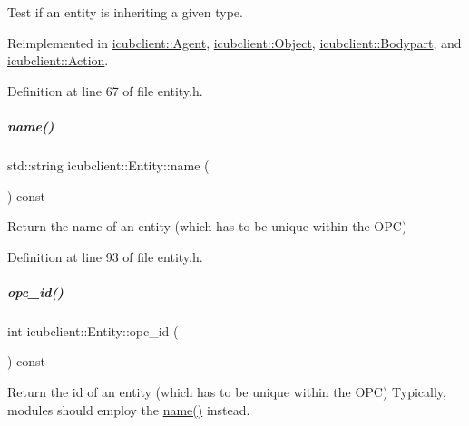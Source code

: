 Test if an entity is inheriting a given type. 



Reimplemented in \hyperlink{group__icubclient__representations_a0ec60560ae6d20bffb64ce9aa6339894}{icubclient\+::\+Agent}, \hyperlink{group__icubclient__representations_a90398d2c9cc2a42617b50fcbc4533734}{icubclient\+::\+Object}, \hyperlink{group__icubclient__representations_a092e89cbeecc23d729be0423216a9920}{icubclient\+::\+Bodypart}, and \hyperlink{group__icubclient__representations_a928f5814d5160e14157391cd85c0cbd0}{icubclient\+::\+Action}.



Definition at line 67 of file entity.\+h.

\mbox{\label{group__icubclient__representations_a622173d0dec878783dcc31aafad49a97}} 
\subparagraph{\texorpdfstring{name()}{name()}}
{\footnotesize\ttfamily std\+::string icubclient\+::\+Entity\+::name (\begin{DoxyParamCaption}{ }\end{DoxyParamCaption}) const\hspace{0.3cm}{\ttfamily [inline]}}



Return the name of an entity (which has to be unique within the O\+PC) 



Definition at line 93 of file entity.\+h.

\mbox{\label{group__icubclient__representations_afbc352dfc6eb9d896024403fdad3096d}} 
\subparagraph{\texorpdfstring{opc\+\_\+id()}{opc\_id()}}
{\footnotesize\ttfamily int icubclient\+::\+Entity\+::opc\+\_\+id (\begin{DoxyParamCaption}{ }\end{DoxyParamCaption}) const\hspace{0.3cm}{\ttfamily [inline]}}



Return the id of an entity (which has to be unique within the O\+PC) Typically, modules should employ the \hyperlink{group__icubclient__representations_a622173d0dec878783dcc31aafad49a97}{name()} instead. 



